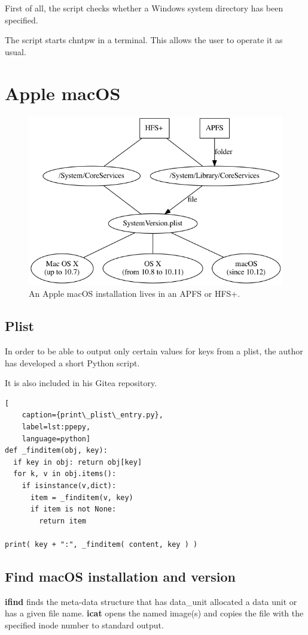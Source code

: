 \noindent First of all, the script checks whether a Windows system 
directory has been specified.

The script starts chntpw in a terminal. This allows the user to operate it as usual.

\section{ Apple macOS}

\begin{figure}[htbp]  %
  \centering
  \includegraphics[width=.5\textwidth]{figures/fs-to-macOS.png}
  \caption[APFS/HFS+ and Apple macOS]{An Apple macOS installation lives in an APFS or HFS+.}
  \label{fig:fs-mac}
\end{figure}

\subsection{Plist}

In order to be able to output only certain values for keys from a plist, the author has developed a short Python script.

It is also included in his Gitea repository.

\begin{lstlisting}[
    caption={print\_plist\_entry.py},
    label=lst:ppepy,
    language=python]
def _finditem(obj, key):
  if key in obj: return obj[key]
  for k, v in obj.items():
    if isinstance(v,dict):
      item = _finditem(v, key)
      if item is not None:
        return item

print( key + ":", _finditem( content, key ) )
\end{lstlisting}

\subsection{Find macOS installation and version}

\textbf{ifind}  finds  the meta-data structure that has data\_unit allocated a data unit or has a given file name.\newline
\newline
\noindent \textbf{icat} opens the named image(s) and copies the file with the specified inode number to standard output.

